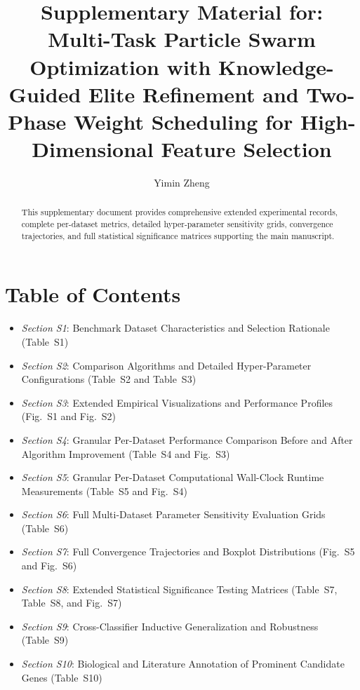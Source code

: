 \documentclass[final,1p,times,fleqn]{elsarticle}
\begin{document}
\begin{frontmatter}

\title{Supplementary Material for:\\Multi-Task Particle Swarm Optimization with Knowledge-Guided Elite Refinement and Two-Phase Weight Scheduling for High-Dimensional Feature Selection}

\author{Yimin Zheng}
\address{Jiangxi University of Water Resources and Electric Power, Nanchang 330099, China}

\begin{abstract}
This supplementary document provides comprehensive extended experimental records, complete per-dataset metrics, detailed hyper-parameter sensitivity grids, convergence trajectories, and full statistical significance matrices supporting the main manuscript.
\end{abstract}

\end{frontmatter}

\section*{Table of Contents}
\begin{itemize}
    \item \textit{Section S1}: Benchmark Dataset Characteristics and Selection Rationale (Table~S1)
    \item \textit{Section S2}: Comparison Algorithms and Detailed Hyper-Parameter Configurations (Table~S2 and Table~S3)
    \item \textit{Section S3}: Extended Empirical Visualizations and Performance Profiles (Fig.~S1 and Fig.~S2)
    \item \textit{Section S4}: Granular Per-Dataset Performance Comparison Before and After Algorithm Improvement (Table~S4 and Fig.~S3)
    \item \textit{Section S5}: Granular Per-Dataset Computational Wall-Clock Runtime Measurements (Table~S5 and Fig.~S4)
    \item \textit{Section S6}: Full Multi-Dataset Parameter Sensitivity Evaluation Grids (Table~S6)
    \item \textit{Section S7}: Full Convergence Trajectories and Boxplot Distributions (Fig.~S5 and Fig.~S6)
    \item \textit{Section S8}: Extended Statistical Significance Testing Matrices (Table~S7, Table~S8, and Fig.~S7)
    \item \textit{Section S9}: Cross-Classifier Inductive Generalization and Robustness (Table~S9)
    \item \textit{Section S10}: Biological and Literature Annotation of Prominent Candidate Genes (Table~S10)
\end{itemize}
\end{document}

